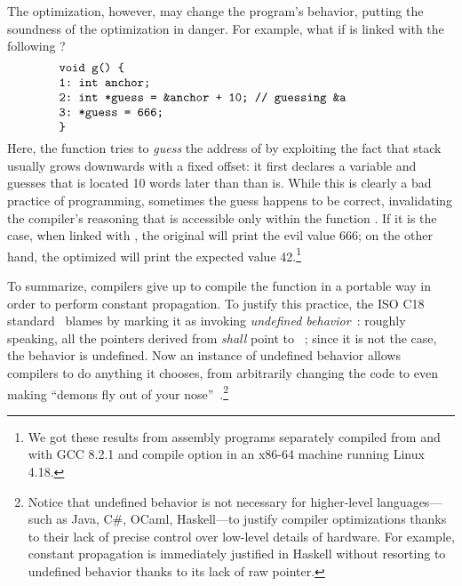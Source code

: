 The optimization, however, may change the program's behavior, putting the soundness of the
optimization in danger.  For example, what if  is linked with the following ?
%
\[
\begin{minipage}{0.8\textwidth}
\begin{verbatim}
void g() {
1: int anchor;
2: int *guess = &anchor + 10; // guessing &a
3: *guess = 666;
}
\end{verbatim}
\end{minipage}
\]
%
\noindent Here, the function  tries to \emph{guess} the address of  by exploiting
the fact that stack usually grows downwards with a fixed offset: it first declares a variable
 and guesses that  is located 10 words later than than  is.  While
this is clearly a bad practice of programming, sometimes the guess happens to be correct,
invalidating the compiler's reasoning that  is accessible only within the function
.  If it is the case, when linked with , the original  will print the
evil value 666; on the other hand, the optimized  will print the expected value
42.\footnote{We got these results from assembly programs separately compiled from  and
   with GCC 8.2.1 and compile option  in an x86-64 machine
  running Linux 4.18.}



To summarize, compilers give up to compile the function  in a portable way in order to
perform constant propagation.  To justify this practice, the ISO C18 standard~\cite{c18} blames
 by marking it as invoking \emph{undefined behavior}~\cite[\S3.4.3p1]{c18}: roughly
speaking, all the pointers derived from  \emph{shall} point to
~\cite[\S6.5.6p8]{c18}; since it is not the case, the behavior is undefined.  Now an
instance of undefined behavior allows compilers to do anything it chooses, from arbitrarily changing
the code to even making ``demons fly out of your nose''~\cite{nasal-demons}.\footnote{Notice that
  undefined behavior is not necessary for higher-level languages---such as Java, C\#, OCaml,
  Haskell---to justify compiler optimizations thanks to their lack of precise control over low-level
  details of hardware.  For example, constant propagation is immediately justified in Haskell
  without resorting to undefined behavior thanks to its lack of raw pointer.}


